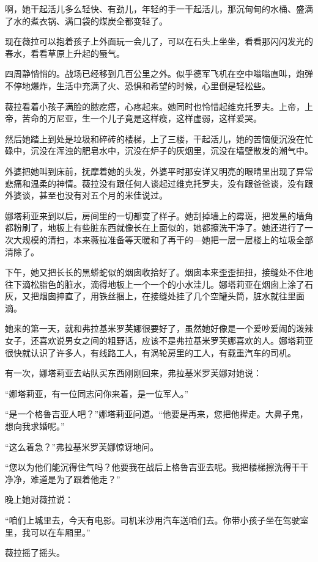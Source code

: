 啊，她干起活儿多么轻快、有劲儿，年轻的手一干起活儿，那沉甸甸的水桶、盛满了水的煮衣锅、满口袋的煤炭全都变轻了。

现在薇拉可以抱着孩子上外面玩一会儿了，可以在石头上坐坐，看看那闪闪发光的春水，看看草原上升起的蜃气。

四周静悄悄的。战场已经移到几百公里之外。似乎德军飞机在空中嗡嗡直叫，炮弹不停地爆炸，生活中充满了火、恐惧和希望的时候，心里倒是轻松些。

薇拉看着小孩子满脸的脓疙瘩，心疼起来。她同时也怜惜起维克托罗夫。上帝，上帝，苦命的万尼亚，生一个儿子竟是这样瘦，这样虚弱，这样爱哭。

然后她踏上到处是垃圾和碎砖的楼梯，上了三楼，干起活儿，她的苦恼便沉没在忙碌中，沉没在浑浊的肥皂水中，沉没在炉子的灰烟里，沉没在墙壁散发的潮气中。

外婆把她叫到床前，抚摩着她的头发，外婆平时那安详又明亮的眼睛里出现了异常悲痛和温柔的神情。薇拉没有跟任何人谈起过维克托罗夫，没有跟爸爸谈，没有跟外婆谈，甚至也没有对五个月的米佳说过。

娜塔莉亚来到以后，房间里的一切都变了样子。她刮掉墙上的霉斑，把发黑的墙角都粉刷了，地板上有些脏东西就像长在上面似的，她都擦洗干净了。她还进行了一次大规模的清扫，本来薇拉准备等天暖和了再干的—她把一层一层楼上的垃圾全部清除了。

下午，她又把长长的黑蟒蛇似的烟囱收拾好了。烟囱本来歪歪扭扭，接缝处不住地往下滴松脂色的脏水，滴得地板上一个一个的小水洼儿。娜塔莉亚在烟囱上涂了石灰，又把烟囱抻直了，用铁丝捆上，在接缝处挂了几个空罐头筒，脏水就往里面滴。

她来的第一天，就和弗拉基米罗芙娜很要好了，虽然她好像是一个爱吵爱闹的泼辣女子，还喜欢说男女之间的粗野话，应该不是弗拉基米罗芙娜喜欢的人。娜塔莉亚很快就认识了许多人，有线路工人，有涡轮房里的工人，有载重汽车的司机。

有一次，娜塔莉亚去站队买东西刚刚回来，弗拉基米罗芙娜对她说：

“娜塔莉亚，有一位同志问你来着，是一位军人。”

“是一个格鲁吉亚人吧？”娜塔莉亚问道。“他要是再来，您把他撵走。大鼻子鬼，想向我求婚呢。”

“这么着急？”弗拉基米罗芙娜惊讶地问。

“您以为他们能沉得住气吗？他要我在战后上格鲁吉亚去呢。我把楼梯擦洗得干干净净，难道是为了跟着他走？”

晚上她对薇拉说：

“咱们上城里去，今天有电影。司机米沙用汽车送咱们去。你带小孩子坐在驾驶室里，我可以在车厢里。”

薇拉摇了摇头。

